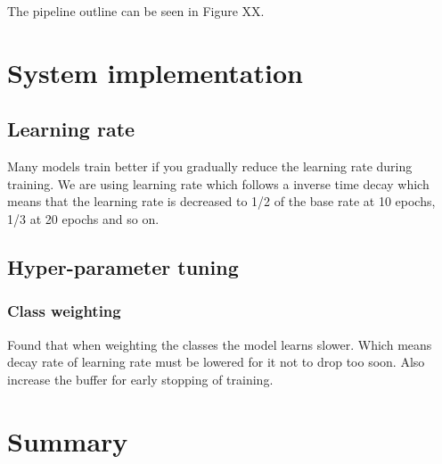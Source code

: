 \documentclass[thesis.tex]{subfiles}
\begin{document}
The pipeline outline can be seen in Figure XX.






\section{System implementation} \label{sec:system_implementation}


\subsection{Learning rate}
Many models train better if you gradually reduce the learning rate during training. We are using learning rate which follows a inverse time decay which means that the learning rate is decreased to 1/2 of the base rate at 10 epochs, 1/3 at 20 epochs and so on.



\subsection{Hyper-parameter tuning}

\subsubsection{Class weighting}
Found that when weighting the classes the model learns slower. Which means decay rate of learning rate must be lowered for it not to drop too soon. Also increase the buffer for early stopping of training.




\section{Summary} \label{sec:C3-summary}
\end{document}
